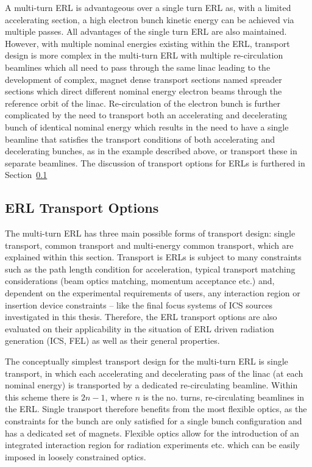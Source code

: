 \documentclass[../main.tex]{subfiles}
\begin{document}
A multi-turn ERL is advantageous over a single turn ERL as, with a limited accelerating section, a high electron bunch kinetic energy can be achieved via multiple passes. All advantages of the single turn ERL are also maintained. However, with multiple nominal energies existing within the ERL, transport design is more complex in the multi-turn ERL with multiple re-circulation beamlines which all need to pass through the same linac leading to the development of complex, magnet dense transport sections named spreader sections which direct different nominal energy electron beams through the reference orbit of the linac. Re-circulation of the electron bunch is further complicated by the need to transport both an accelerating and decelerating bunch of identical nominal energy which results in the need to have a single beamline that satisfies the transport conditions of both accelerating and decelerating bunches, as in the example described above, or transport these in separate beamlines. The discussion of transport options for ERLs is furthered in Section~\ref{sec:ERL_transport_options} 

\subsection{ERL Transport Options}
\label{sec:ERL_transport_options}

The multi-turn ERL has three main possible forms of transport design: single transport, common transport and multi-energy common transport, which are explained within this section. Transport is ERLs is subject to many constraints such as the path length condition for acceleration, typical transport matching considerations (beam optics matching, momentum acceptance etc.) and, dependent on the experimental requirements of users, any interaction region or insertion device constraints -- like the final focus systems of ICS sources investigated in this thesis. Therefore, the ERL transport options are also evaluated on their applicability in the situation of ERL driven radiation generation (ICS, FEL) as well as their general properties.

The conceptually simplest transport design for the multi-turn ERL is single transport, in which each accelerating and decelerating pass of the linac (at each nominal energy) is transported by a dedicated re-circulating beamline. Within this scheme there is $2n-1$, where $n$ is the no. turns, re-circulating beamlines in the ERL. Single transport therefore benefits from the most flexible optics, as the constraints for the bunch are only satisfied for a single bunch configuration and has a dedicated set of magnets. Flexible optics allow for the introduction of an integrated interaction region for radiation experiments etc. which can be easily imposed in loosely constrained optics. 
\end{document}
